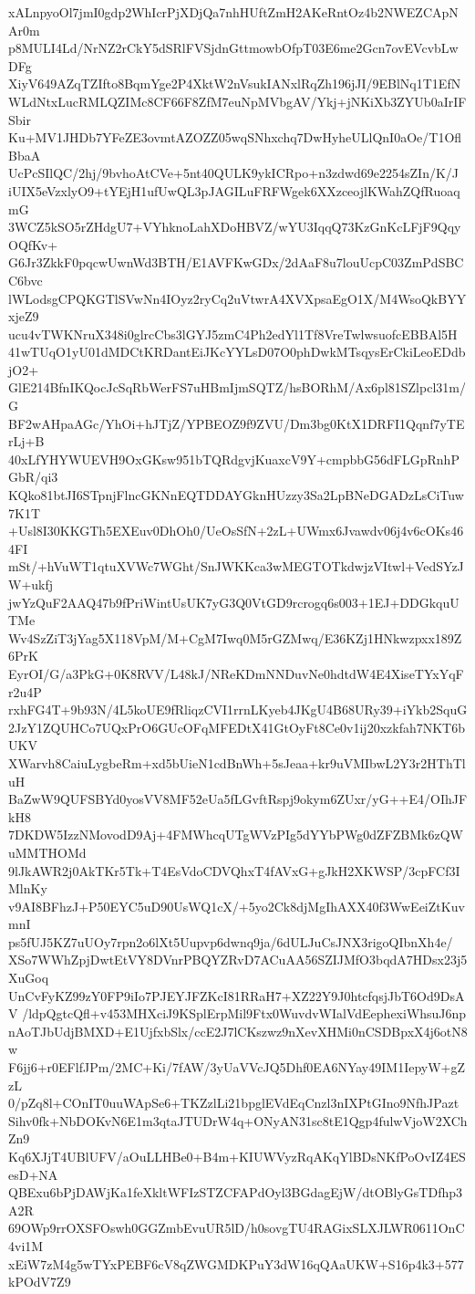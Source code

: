 xALnpyoOl7jmI0gdp2WhIcrPjXDjQa7nhHUftZmH2AKeRntOz4b2NWEZCApNAr0m
p8MULI4Ld/NrNZ2rCkY5dSRlFVSjdnGttmowbOfpT03E6me2Gcn7ovEVcvbLwDFg
XiyV649AZqTZIfto8BqmYge2P4XktW2nVsukIANxlRqZh196jJI/9EBlNq1T1EfN
WLdNtxLucRMLQZIMc8CF66F8ZfM7euNpMVbgAV/Ykj+jNKiXb3ZYUb0aIrIFSbir
Ku+MV1JHDb7YFeZE3ovmtAZOZZ05wqSNhxchq7DwHyheULlQnI0aOe/T1OflBbaA
UcPcSIlQC/2hj/9bvhoAtCVe+5nt40QULK9ykICRpo+n3zdwd69e2254sZIn/K/J
iUIX5eVzxlyO9+tYEjH1ufUwQL3pJAGILuFRFWgek6XXzceojlKWahZQfRuoaqmG
3WCZ5kSO5rZHdgU7+VYhknoLahXDoHBVZ/wYU3IqqQ73KzGnKcLFjF9QqyOQfKv+
G6Jr3ZkkF0pqcwUwnWd3BTH/E1AVFKwGDx/2dAaF8u7louUcpC03ZmPdSBCC6bvc
lWLodsgCPQKGTlSVwNn4IOyz2ryCq2uVtwrA4XVXpsaEgO1X/M4WsoQkBYYxjeZ9
ucu4vTWKNruX348i0glrcCbs3lGYJ5zmC4Ph2edYl1Tf8VreTwlwsuofcEBBAl5H
41wTUqO1yU01dMDCtKRDantEiJKcYYLsD07O0phDwkMTsqysErCkiLeoEDdbjO2+
GlE214BfnIKQocJcSqRbWerFS7uHBmIjmSQTZ/hsBORhM/Ax6pl81SZlpcl31m/G
BF2wAHpaAGc/YhOi+hJTjZ/YPBEOZ9f9ZVU/Dm3bg0KtX1DRFI1Qqnf7yTErLj+B
40xLfYHYWUEVH9OxGKsw951bTQRdgvjKuaxcV9Y+cmpbbG56dFLGpRnhPGbR/qi3
KQko81btJI6STpnjFlncGKNnEQTDDAYGknHUzzy3Sa2LpBNeDGADzLsCiTuw7K1T
+Usl8I30KKGTh5EXEuv0DhOh0/UeOsSfN+2zL+UWmx6Jvawdv06j4v6cOKs464FI
mSt/+hVuWT1qtuXVWc7WGht/SnJWKKca3wMEGTOTkdwjzVItwl+VedSYzJW+ukfj
jwYzQuF2AAQ47b9fPriWintUsUK7yG3Q0VtGD9rcrogq6s003+1EJ+DDGkquUTMe
Wv4SzZiT3jYag5X118VpM/M+CgM7Iwq0M5rGZMwq/E36KZj1HNkwzpxx189Z6PrK
EyrOI/G/a3PkG+0K8RVV/L48kJ/NReKDmNNDuvNe0hdtdW4E4XiseTYxYqFr2u4P
rxhFG4T+9b93N/4L5koUE9fRliqzCVI1rrnLKyeb4JKgU4B68URy39+iYkb2SquG
2JzY1ZQUHCo7UQxPrO6GUcOFqMFEDtX41GtOyFt8Ce0v1ij20xzkfah7NKT6bUKV
XWarvh8CaiuLygbeRm+xd5bUieN1cdBnWh+5sJeaa+kr9uVMIbwL2Y3r2HThTluH
BaZwW9QUFSBYd0yosVV8MF52eUa5fLGvftRspj9okym6ZUxr/yG++E4/OIhJFkH8
7DKDW5IzzNMovodD9Aj+4FMWhcqUTgWVzPIg5dYYbPWg0dZFZBMk6zQWuMMTHOMd
9lJkAWR2j0AkTKr5Tk+T4EsVdoCDVQhxT4fAVxG+gJkH2XKWSP/3cpFCf3IMlnKy
v9AI8BFhzJ+P50EYC5uD90UsWQ1cX/+5yo2Ck8djMgIhAXX40f3WwEeiZtKuvmnI
ps5fUJ5KZ7uUOy7rpn2o6lXt5Uupvp6dwnq9ja/6dULJuCsJNX3rigoQIbnXh4e/
XSo7WWhZpjDwtEtVY8DVnrPBQYZRvD7ACuAA56SZIJMfO3bqdA7HDsx23j5XuGoq
UnCvFyKZ99zY0FP9iIo7PJEYJFZKcI81RRaH7+XZ22Y9J0htcfqsjJbT6Od9DsAV
/ldpQgtcQfl+v453MHXciJ9KSplErpMil9Ftx0WuvdvWIalVdEephexiWhsuJ6np
nAoTJbUdjBMXD+E1UjfxbSlx/ccE2J7lCKszwz9nXevXHMi0nCSDBpxX4j6otN8w
F6jj6+r0EFlfJPm/2MC+Ki/7fAW/3yUaVVcJQ5Dhf0EA6NYay49IM1IepyW+gZzL
0/pZq8l+COnIT0uuWApSe6+TKZzlLi21bpglEVdEqCnzl3nIXPtGIno9NfhJPazt
Sihv0fk+NbDOKvN6E1m3qtaJTUDrW4q+ONyAN31sc8tE1Qgp4fulwVjoW2XChZn9
Kq6XJjT4UBlUFV/aOuLLHBe0+B4m+KIUWVyzRqAKqYlBDsNKfPoOvIZ4ESesD+NA
QBExu6bPjDAWjKa1feXkltWFIzSTZCFAPdOyl3BGdagEjW/dtOBlyGsTDfhp3A2R
69OWp9rrOXSFOswh0GGZmbEvuUR5lD/h0sovgTU4RAGixSLXJLWR0611OnC4vi1M
xEiW7zM4g5wTYxPEBF6cV8qZWGMDKPuY3dW16qQAaUKW+S16p4k3+577kPOdV7Z9
